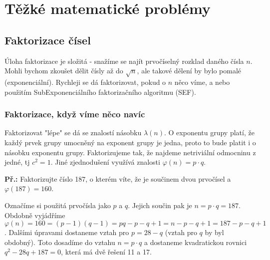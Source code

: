 \documentclass[10pt,a4paper]{article}
\begin{document}
\section{Těžké matematické problémy}
\subsection{Faktorizace čísel}
Úloha faktorizace je složitá - snažíme se najít prvočíselný rozklad daného čísla
$n$. Mohli bychom zkoušet dělit čísly až do $\sqrt{n}$, ale takové dělení by
bylo pomalé (exponenciální). Rychleji se dá faktorizovat, pokud o $n$ něco víme,
a nebo použitím SubExponenciálního faktorizačního algoritmu (SEF).

\subsubsection{Faktorizace, když víme něco navíc}

Faktorizovat "lépe" se dá se znalostí násobku $\lambda(n)$. O exponentu grupy
platí, že každý prvek grupy umocněný na exponent grupy je jedna, proto to bude
platit i o násobku exponentu grupy. Faktorizujeme tak, že najdeme netriviální
odmocninu z jedné, tj $c^2 = 1$. Jiné zjednodušení využívá znalosti $\varphi(n)
= p \cdot q$.

\begin{exercise}
\textbf{Př.:} Faktorizujte číslo 187, o kterém víte, že je součinem dvou
prvočísel a $\varphi(187) = 160$.

Označíme si použitá prvočísla jako $p$ a $q$. Jejich součin pak je $n = p \cdot
q = 187$. Obdobně vyjádříme $\varphi(n) = 160 = (p-1)(q-1) = pq - p - q + 1 = n
- p - q + 1 = 187 - p - q + 1$. Dalšími úpravami dostaneme vztah pro $p = 28 -
q$ (vztah pro $q$ by byl obdobný). Toto dosadíme do vztahu $n = p\cdot q$ a
dostaneme kvadratickou rovnici $q^2 - 28q + 187 = 0$, která má dvě řešení 11 a
17.
\end{exercise}
\end{document}
